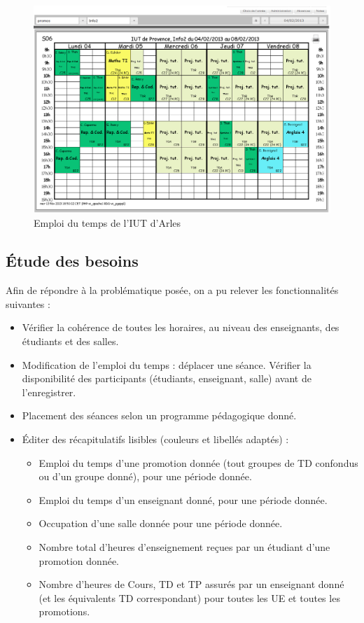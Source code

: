\documentclass{article}
\begin{document}
\newpage
\begin{figure}[!ht]
\begin{center}
\includegraphics[scale=0.6]{img/edt_iut_arles.png}
\caption{Emploi du temps de l'IUT d'Arles}
\end{center}
\end{figure}



\subsection{\'Etude des besoins}
Afin de répondre à la problématique posée, on a pu relever les fonctionnalités suivantes :
\begin{itemize}
\item Vérifier la cohérence de toutes les horaires, au niveau des enseignants, des étudiants et des salles.
\item Modification de l'emploi du temps : déplacer une séance. Vérifier la disponibilité des participants (étudiants, enseignant, salle) avant de l'enregistrer.
\item Placement des séances selon un programme pédagogique donné.
\item \'Editer des récapitulatifs lisibles (couleurs et libellés adaptés) :
    \begin{itemize}
    \item Emploi du temps d'une promotion donnée (tout groupes de TD confondus ou d'un groupe donné), pour une période donnée.
    \item Emploi du temps d'un enseignant donné, pour une période donnée.
    \item Occupation d'une salle donnée pour une période donnée.
    \item Nombre total d'heures d'enseignement reçues par un étudiant d'une promotion donnée.
    \item Nombre d'heures de Cours, TD et TP assurés par un enseignant donné (et les équivalents TD correspondant) pour toutes les UE et toutes les promotions.
    \end{itemize}
\end{itemize}
\end{document}
